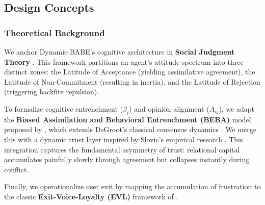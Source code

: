 \subsection{Design Concepts}

\subsubsection{Theoretical Background}
We anchor Dynamic-BABE's cognitive architecture in \textbf{Social Judgment Theory} \citep{Sherif1961, Jager2005}. This framework partitions an agent's attitude spectrum into three distinct zones: the Latitude of Acceptance (yielding assimilative agreement), the Latitude of Non-Commitment (resulting in inertia), and the Latitude of Rejection (triggering backfire repulsion).

To formalize cognitive entrenchment ($\beta_i$) and opinion alignment ($A_{ij}$), we adapt the \textbf{Biased Assimilation and Behavioral Entrenchment (BEBA)} model proposed by \citet{Chen2021}, which extends DeGroot's classical consensus dynamics \citep{DeGroot1974}. We merge this with a dynamic trust layer inspired by Slovic's empirical research \citep{Slovic1993}. This integration captures the fundamental asymmetry of trust: relational capital accumulates painfully slowly through agreement but collapses instantly during conflict.

Finally, we operationalize user exit by mapping the accumulation of frustration to the classic \textbf{Exit-Voice-Loyalty (EVL)} framework of \citet{Hirschman1970}.

